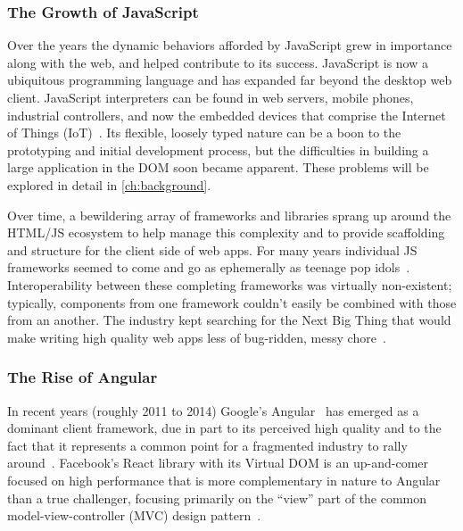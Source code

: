 \subsubsection{The Growth of JavaScript}
Over the years the dynamic behaviors afforded by JavaScript grew in importance along with the web, and helped contribute to its success. 
JavaScript is now a ubiquitous programming language and has expanded far beyond the desktop web client. 
JavaScript interpreters can be found in web servers, mobile phones, industrial controllers, and now the embedded devices that comprise the Internet of Things (IoT)~\cite{flaki2015}.
Its flexible, loosely typed nature can be a boon to the prototyping and initial development process,
but the difficulties in building a large application in the DOM soon became apparent.
These problems will be explored in detail in \cref{ch:background}.

Over time, a bewildering array of frameworks and libraries sprang up around the HTML/JS ecosystem to help manage this complexity and to provide scaffolding and structure for the client side of web apps.
For many years individual JS frameworks seemed to come and go as ephemerally as teenage pop idols~\cite{allenpike2015}. 
Interoperability between these completing frameworks was virtually non-existent; 
typically, components from one framework couldn't easily be combined with those from an another.
The industry kept searching for the Next Big Thing that would make writing high quality web apps less of bug-ridden, messy chore~\cite{allenpike2015}. 

\subsubsection{The Rise of Angular}
In recent years (roughly 2011 to 2014) Google's Angular~\cite{googledevelopers2015-b}
has emerged as a dominant client framework, 
due in part to its perceived high quality and to the fact that it represents a common point for a fragmented industry to rally around~\cite{dickey2014}.
Facebook's React library with its Virtual DOM is an up-and-comer focused on high performance that is more complementary in nature to Angular than a true challenger, 
focusing primarily on the ``view'' part of the common 
model-view-controller (MVC) 
design pattern~\cite{reactcontributors2015}.

